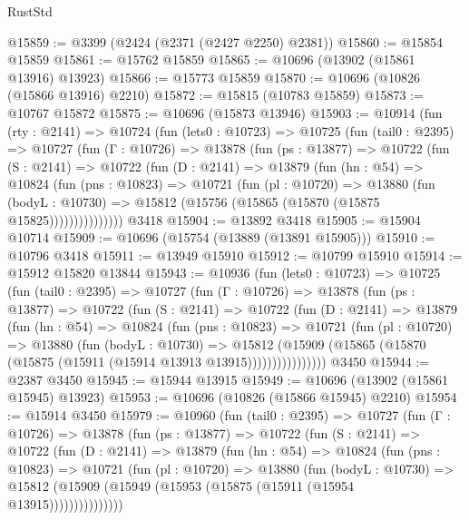 \begin{lexlean}{RustStd}
\begin{coremodule}
@15859 := @3399 (@2424 (@2371 (@2427 @2250) @2381))
@15860 := @15854 @15859
@15861 := @15762 @15859
@15865 := @10696 (@13902 (@15861 @13916) @13923)
@15866 := @15773 @15859
@15870 := @10696 (@10826 (@15866 @13916) @2210)
@15872 := @15815 (@10783 @15859)
@15873 := @10767 @15872
@15875 := @10696 (@15873 @13946)
@15903 := @10914
    (fun (rty : @2141) =>
    @10724
      (fun (lets0 : @10723) =>
      @10725
        (fun (tail0 : @2395) =>
        @10727
          (fun (Γ : @10726) =>
          @13878
            (fun (ps : @13877) =>
            @10722
              (fun (S : @2141) =>
              @10722
                (fun (D : @2141) =>
                @13879
                  (fun (hn : @54) =>
                  @10824
                    (fun (pns : @10823) =>
                    @10721
                      (fun (pl : @10720) =>
                      @13880
                        (fun (bodyL : @10730) =>
                        @15812 (@15756 (@15865 (@15870 (@15875 @15825)))))))))))))))
    @3418
@15904 := @13892 @3418
@15905 := @15904 @10714
@15909 := @10696 (@15754 (@13889 (@13891 @15905)))
@15910 := @10796 @3418
@15911 := @13949 @15910
@15912 := @10799 @15910
@15914 := @15912 @15820 @13844
@15943 := @10936
    (fun (lets0 : @10723) =>
    @10725
      (fun (tail0 : @2395) =>
      @10727
        (fun (Γ : @10726) =>
        @13878
          (fun (ps : @13877) =>
          @10722
            (fun (S : @2141) =>
            @10722
              (fun (D : @2141) =>
              @13879
                (fun (hn : @54) =>
                @10824
                  (fun (pns : @10823) =>
                  @10721
                    (fun (pl : @10720) =>
                    @13880
                      (fun (bodyL : @10730) =>
                      @15812
                        (@15909
                          (@15865 (@15870 (@15875 (@15911 (@15914 @13913 @13915))))))))))))))))
    @3450
@15944 := @2387 @3450
@15945 := @15944 @13915
@15949 := @10696 (@13902 (@15861 @15945) @13923)
@15953 := @10696 (@10826 (@15866 @15945) @2210)
@15954 := @15914 @3450
@15979 := @10960
    (fun (tail0 : @2395) =>
    @10727
      (fun (Γ : @10726) =>
      @13878
        (fun (ps : @13877) =>
        @10722
          (fun (S : @2141) =>
          @10722
            (fun (D : @2141) =>
            @13879
              (fun (hn : @54) =>
              @10824
                (fun (pns : @10823) =>
                @10721
                  (fun (pl : @10720) =>
                  @13880
                    (fun (bodyL : @10730) =>
                    @15812 (@15909 (@15949 (@15953 (@15875 (@15911 (@15954 @13915)))))))))))))))

\end{coremodule}
\end{lexlean}
